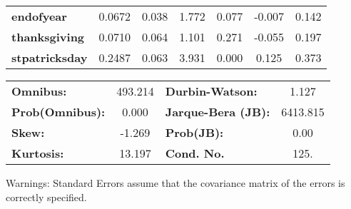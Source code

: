 \begin{center}
\begin{tabular}{lcccccc}
\textbf{endofyear}                         &       0.0672  &        0.038     &     1.772  &         0.077        &       -0.007    &        0.142     \\
\textbf{thanksgiving}                      &       0.0710  &        0.064     &     1.101  &         0.271        &       -0.055    &        0.197     \\
\textbf{stpatricksday}                     &       0.2487  &        0.063     &     3.931  &         0.000        &        0.125    &        0.373     \\
\bottomrule
\end{tabular}
\begin{tabular}{lclc}
\textbf{Omnibus:}       & 493.214 & \textbf{  Durbin-Watson:     } &    1.127  \\
\textbf{Prob(Omnibus):} &   0.000 & \textbf{  Jarque-Bera (JB):  } & 6413.815  \\
\textbf{Skew:}          &  -1.269 & \textbf{  Prob(JB):          } &     0.00  \\
\textbf{Kurtosis:}      &  13.197 & \textbf{  Cond. No.          } &     125.  \\
\bottomrule
\end{tabular}
\end{center}

Warnings: \newline
 [1] Standard Errors assume that the covariance matrix of the errors is correctly specified.